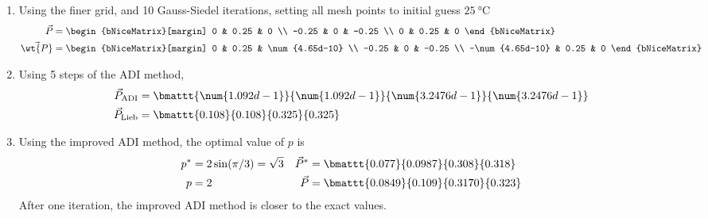\begin{enumerate}
    \item Using the finer grid, and 10 Gauss-Siedel iterations, setting all mesh points
          to initial guess $ \SI{25}{\celsius} $
          \begin{align}
              \vec{P}      & = \begin{bNiceMatrix}[margin]
                                   0     & 0.25 & 0     \\
                                   -0.25 & 0    & -0.25 \\
                                   0     & 0.25 & 0
                               \end{bNiceMatrix}              \\
              \vec{\wt{P}} & = \begin{bNiceMatrix}[margin]
                                   0               & 0.25 & \num{4.65d-10} \\
                                   -0.25           & 0    & -0.25          \\
                                   -\num{4.65d-10} & 0.25 & 0
                               \end{bNiceMatrix}
          \end{align}

    \item Using 5 steps of the ADI method,
          \begin{align}
              \vec{P}_{\text{ADI}}  & = \bmattt{\num{1.092d-1}}{\num{1.092d-1}}
              {\num{3.2476d-1}}{\num{3.2476d-1}}                                \\
              \vec{P}_{\text{Lieb}} & = \bmattt{0.108}{0.108}{0.325}{0.325}
          \end{align}

    \item Using the improved ADI method, the optimal value of $ p $ is
          \begin{align}
              p^*       & = 2 \sin(\pi/3) = \sqrt{3}              &
              \vec{P}^* & = \bmattt{0.077}{0.0987}{0.308}{0.318}    \\
              p         & = 2                                     &
              \vec{P}   & = \bmattt{0.0849}{0.109}{0.3170}{0.323}
          \end{align}
          After one iteration, the improved ADI method is closer to the exact values.


\end{enumerate}
